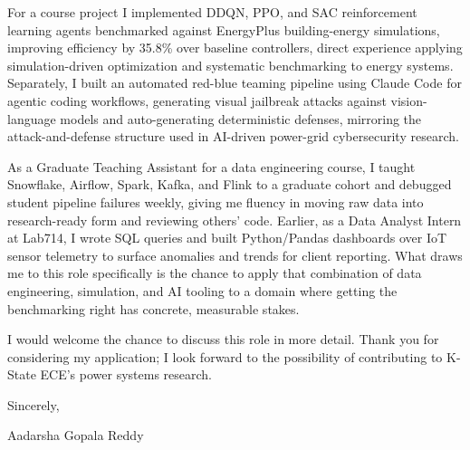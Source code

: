 \documentclass[10pt, letterpaper]{article}
\begin{document}
\vspace{\headerSpacing}
\begin{onecolentry}
	For a course project I implemented DDQN, PPO, and SAC reinforcement learning agents benchmarked against EnergyPlus building-energy simulations, improving efficiency by 35.8\% over baseline controllers, direct experience applying simulation-driven optimization and systematic benchmarking to energy systems. Separately, I built an automated red-blue teaming pipeline using Claude Code for agentic coding workflows, generating visual jailbreak attacks against vision-language models and auto-generating deterministic defenses, mirroring the attack-and-defense structure used in AI-driven power-grid cybersecurity research.
\end{onecolentry}

\vspace{\headerSpacing}
\begin{onecolentry}
	As a Graduate Teaching Assistant for a data engineering course, I taught Snowflake, Airflow, Spark, Kafka, and Flink to a graduate cohort and debugged student pipeline failures weekly, giving me fluency in moving raw data into research-ready form and reviewing others' code. Earlier, as a Data Analyst Intern at Lab714, I wrote SQL queries and built Python/Pandas dashboards over IoT sensor telemetry to surface anomalies and trends for client reporting. What draws me to this role specifically is the chance to apply that combination of data engineering, simulation, and AI tooling to a domain where getting the benchmarking right has concrete, measurable stakes.
\end{onecolentry}

\vspace{\headerSpacing}
\begin{onecolentry}
	I would welcome the chance to discuss this role in more detail. Thank you for considering my application; I look forward to the possibility of contributing to K-State ECE's power systems research.
\end{onecolentry}

\vspace{\headerSpacing}
\begin{onecolentry}
	Sincerely,
\end{onecolentry}

\vspace{\headerSpacing}
\begin{onecolentry}
	Aadarsha Gopala Reddy\\
\end{onecolentry}
\end{document}
